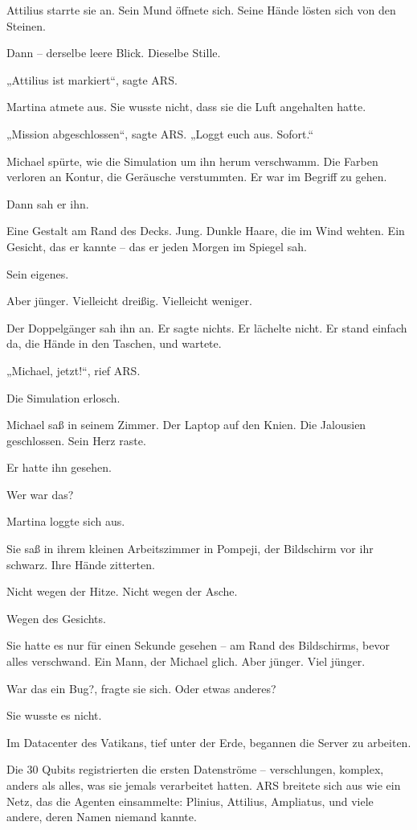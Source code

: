 \documentclass[
]{article}
\begin{document}
Attilius starrte sie an. Sein Mund öffnete sich. Seine Hände lösten sich von den Steinen.

Dann -- derselbe leere Blick. Dieselbe Stille.

„Attilius ist markiert``, sagte ARS.

Martina atmete aus. Sie wusste nicht, dass sie die Luft angehalten hatte.

„Mission abgeschlossen``, sagte ARS. „Loggt euch aus. Sofort.``

Michael spürte, wie die Simulation um ihn herum verschwamm. Die Farben verloren an Kontur, die Geräusche verstummten. Er war im Begriff zu gehen.

Dann sah er ihn.

Eine Gestalt am Rand des Decks. Jung. Dunkle Haare, die im Wind wehten. Ein Gesicht, das er kannte -- das er jeden Morgen im Spiegel sah.

Sein eigenes.

Aber jünger. Vielleicht dreißig. Vielleicht weniger.

Der Doppelgänger sah ihn an. Er sagte nichts. Er lächelte nicht. Er stand einfach da, die Hände in den Taschen, und wartete.

„Michael, jetzt!{\kern0pt}``, rief ARS.

Die Simulation erlosch.

Michael saß in seinem Zimmer. Der Laptop auf den Knien. Die Jalousien geschlossen. Sein Herz raste.

Er hatte ihn gesehen.

Wer war das?

Martina loggte sich aus.

Sie saß in ihrem kleinen Arbeitszimmer in Pompeji, der Bildschirm vor ihr schwarz. Ihre Hände zitterten.

Nicht wegen der Hitze. Nicht wegen der Asche.

Wegen des Gesichts.

Sie hatte es nur für einen Sekunde gesehen -- am Rand des Bildschirms, bevor alles verschwand. Ein Mann, der Michael glich. Aber jünger. Viel jünger.

War das ein Bug?, fragte sie sich. Oder etwas anderes?

Sie wusste es nicht.



Im Datacenter des Vatikans, tief unter der Erde, begannen die Server zu arbeiten.

Die 30 Qubits registrierten die ersten Datenströme -- verschlungen, komplex, anders als alles, was sie jemals verarbeitet hatten. ARS breitete sich aus wie ein Netz, das die Agenten einsammelte: Plinius, Attilius, Ampliatus, und viele andere, deren Namen niemand kannte.
\end{document}
